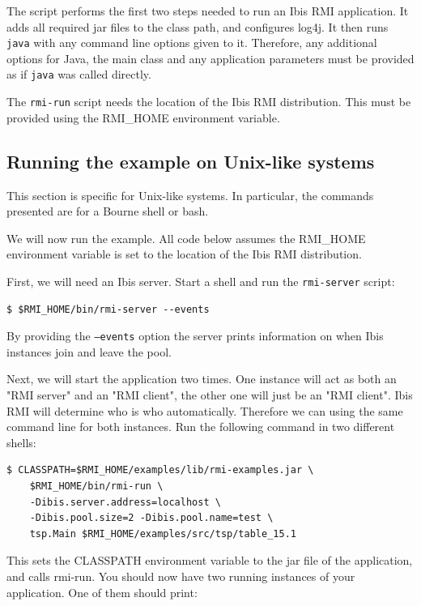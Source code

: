 \documentclass[a4paper,10pt]{article}
\begin{document}
The script performs the first two steps needed to run an Ibis RMI application.
It adds all required jar files
to the class path, and configures log4j.
It then runs \texttt{java} with any
command line options given to it. Therefore, any additional options for
Java, the main class and any application parameters must be provided as
if \texttt{java} was called directly.

The \texttt{rmi-run} script needs the location of the Ibis RMI
distribution. This must be provided using the RMI\_HOME environment
variable.

\subsection{Running the example on Unix-like systems}

This section is specific for Unix-like systems. In particular, the
commands presented are for a Bourne shell or bash.

We will now run the example. All code below assumes the RMI\_HOME
environment variable is set to the location of the Ibis RMI distribution.

First, we will need an Ibis server. Start a shell and
run the \texttt{rmi-server} script:
\noindent
{\small
\begin{verbatim}
$ $RMI_HOME/bin/rmi-server --events
\end{verbatim}
}
\noindent

By providing the \texttt{--events} option the server
prints information on when Ibis instances join and leave the pool.

Next, we will start the application two times. One instance will act as both
an "RMI server" and an "RMI client", the other one will just be an "RMI client".
Ibis RMI will determine who is who automatically. Therefore we can using the
same command line for both instances.
Run the following command in two different shells:

\noindent
{\small
\begin{verbatim}
$ CLASSPATH=$RMI_HOME/examples/lib/rmi-examples.jar \
    $RMI_HOME/bin/rmi-run \
    -Dibis.server.address=localhost \
    -Dibis.pool.size=2 -Dibis.pool.name=test \
    tsp.Main $RMI_HOME/examples/src/tsp/table_15.1
\end{verbatim}
}
\noindent

This sets the CLASSPATH environment variable to the jar file of the
application, and calls rmi-run. You should now have two running
instances of your application. One of them should print:
\end{document}
